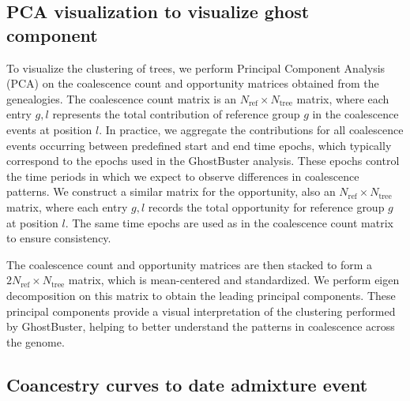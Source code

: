 \subsection{PCA visualization to visualize ghost component}

To visualize the clustering of trees, we perform Principal Component Analysis (PCA) on the coalescence count and opportunity matrices obtained from the genealogies. The coalescence count matrix is an $N_{\text{ref}} \times N_{\text{tree}}$ matrix, where each entry $g,l$ represents the total contribution of reference group $g$ in the coalescence events at position $l$. In practice, we aggregate the contributions for all coalescence events occurring between predefined start and end time epochs, which typically correspond to the epochs used in the GhostBuster analysis. These epochs control the time periods in which we expect to observe differences in coalescence patterns. We construct a similar matrix for the opportunity, also an $N_{\text{ref}} \times N_{\text{tree}}$ matrix, where each entry $g,l$ records the total opportunity for reference group $g$ at position $l$. The same time epochs are used as in the coalescence count matrix to ensure consistency.

The coalescence count and opportunity matrices are then stacked to form a $2N_{\text{ref}} \times N_{\text{tree}}$ matrix, which is mean-centered and standardized. We perform eigen decomposition on this matrix to obtain the leading principal components. These principal components provide a visual interpretation of the clustering performed by GhostBuster, helping to better understand the patterns in coalescence across the genome.

\subsection{Coancestry curves to date admixture event}
\label{sec:ch2-gb-coancestry}

